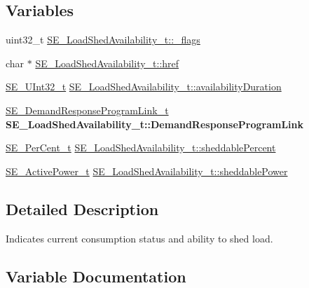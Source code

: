 \subsection*{Variables}
\begin{DoxyCompactItemize}
\item 
uint32\+\_\+t \hyperlink{group__LoadShedAvailability_ga404541fef1f866fbfc92c7f236622e07}{S\+E\+\_\+\+Load\+Shed\+Availability\+\_\+t\+::\+\_\+flags}
\item 
char $\ast$ \hyperlink{group__LoadShedAvailability_ga09ec435977ecddd0dc707dec6818d08e}{S\+E\+\_\+\+Load\+Shed\+Availability\+\_\+t\+::href}
\item 
\hyperlink{group__UInt32_ga70bd4ecda3c0c85d20779d685a270cdb}{S\+E\+\_\+\+U\+Int32\+\_\+t} \hyperlink{group__LoadShedAvailability_ga200cb55232c00f729b128f5414767e00}{S\+E\+\_\+\+Load\+Shed\+Availability\+\_\+t\+::availability\+Duration}
\item 
\mbox{\label{group__LoadShedAvailability_ga106ceb952dc5f3d711e1cb21d6f9082b}} 
\hyperlink{structSE__DemandResponseProgramLink__t}{S\+E\+\_\+\+Demand\+Response\+Program\+Link\+\_\+t} {\bfseries S\+E\+\_\+\+Load\+Shed\+Availability\+\_\+t\+::\+Demand\+Response\+Program\+Link}
\item 
\hyperlink{group__PerCent_ga14278cbee754c63496035b722b417ddc}{S\+E\+\_\+\+Per\+Cent\+\_\+t} \hyperlink{group__LoadShedAvailability_ga884487f6c05e859588d1880d494aa5eb}{S\+E\+\_\+\+Load\+Shed\+Availability\+\_\+t\+::sheddable\+Percent}
\item 
\hyperlink{structSE__ActivePower__t}{S\+E\+\_\+\+Active\+Power\+\_\+t} \hyperlink{group__LoadShedAvailability_ga1a6b6f3e9fc1c6520221cce4af77712f}{S\+E\+\_\+\+Load\+Shed\+Availability\+\_\+t\+::sheddable\+Power}
\end{DoxyCompactItemize}


\subsection{Detailed Description}
Indicates current consumption status and ability to shed load. 

\subsection{Variable Documentation}
\mbox{\label{group__LoadShedAvailability_ga404541fef1f866fbfc92c7f236622e07}} 

